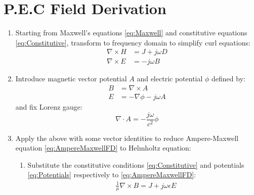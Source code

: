 \documentclass{article}
\begin{document}
\section{P.E.C Field Derivation}
    \begin{enumerate}
        \item   Starting from Maxwell's equations \eqref{eq:Maxwell} and constitutive equations \eqref{eq:Constitutive}, transform to frequency domain to simplify curl equations:
                \begin{subequations}\label{eq:MaxwellFD}
                    \begin{align}
                        \nabla \times H &= J + j \omega D \label{eq:AmpereMaxwellFD} \\
                        \nabla \times E &= - j \omega B \label{eq:MaxwellFaradayFD}
                    \end{align}
                \end{subequations}
        \item   Introduce magnetic vector potential $A$ and electric potential $\phi$ defined by:
                \begin{subequations}\label{eq:Potentials}
                    \begin{align}
                        B &= \nabla \times A \label{eq:MagneticPotential} \\
                        E &= - \nabla \phi - j \omega A \label{eq:ElectricPotential}
                    \end{align}
                \end{subequations}
                and fix Lorenz gauge:
                \begin{equation} \label{eq:LorenzGaugeCondition}
                    \nabla \cdot A = - \frac{j \omega}{c^2} \phi
                \end{equation}
        \item   Apply the above with some vector identities to reduce Ampere-Maxwell equation \eqref{eq:AmpereMaxwellFD} to Helmholtz equation:
                \begin{enumerate}
                    \item Substitute the constitutive conditions \eqref{eq:Constitutive} and potentials \eqref{eq:Potentials} respectively to \eqref{eq:AmpereMaxwellFD}:
                        \begin{align*}
                            & \frac{1}{\mu} \nabla \times B = J + j \omega \epsilon E \\

\end{align*}
\end{enumerate}
\end{enumerate}
\end{document}

